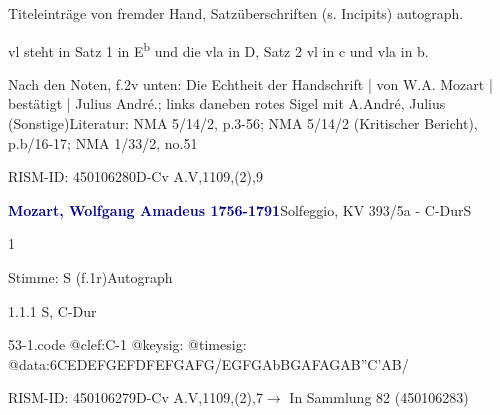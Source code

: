 \documentclass[a4paper, twocolumn, 11pt]{book}
\begin{document}
\newline %
\par Titeleinträge von fremder Hand, Satzüberschriften (s. Incipits) autograph.
\par vl steht in Satz 1 in E\textsuperscript{b} und die vla in D, Satz 2 vl in c und vla in b.
\par Nach den Noten, f.2v unten: {\textquotedbl}Die Echtheit der Handschrift | von W.A. Mozart | bestätigt | Julius André.{\textquotedbl}; links daneben rotes Sigel mit {\textquotedbl}A{\textquotedbl}.\newline André, Julius  (Sonstige)\newline Literatur: NMA  5/14/2, p.3-56; NMA  5/14/2 (Kritischer Bericht), p.b/16-17; NMA  1/33/2, no.51
\par RISM-ID: 450106280\newline D-Cv  A.V,1109,(2),9
\par \vspace{16pt} \textcolor{darkblue}{\textbf{Mozart, Wolfgang Amadeus  1756-1791}}\hfillplus{[53]}\newline Solfeggio, KV 393/5a - C-Dur\newline S
\par \begin{itshape} 1\end{itshape} 
\par \textcolor{darkblue}{}  Stimme: S  (f.1r)\newline Autograph
\par 1.1.1  S, C-Dur  
\begin{filecontents*}{53-1.code}
@clef:C-1
@keysig:
@timesig:
@data:{6CEDE}{FGEF}{DFEF}{GAFG}/{EGFG}{AbBGA}{FAGA}{B''C'AB}/
\end{filecontents*}

\newline %
\par RISM-ID: 450106279\newline D-Cv  A.V,1109,(2),7\newline $\rightarrow$ In Sammlung 82 (450106283)
      
\end{document}
